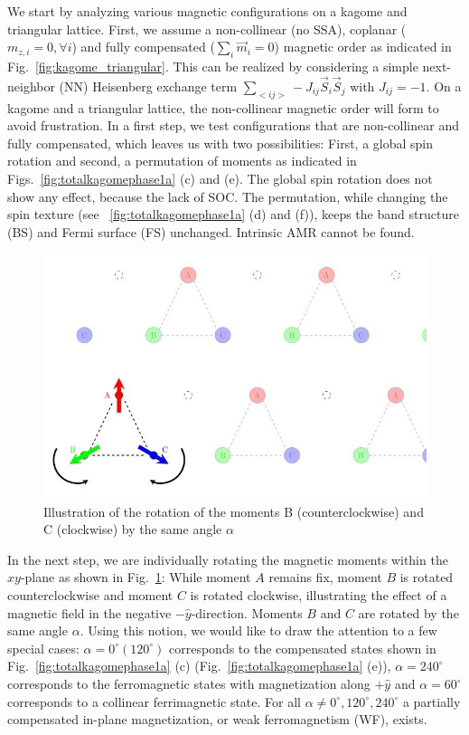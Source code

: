 \documentclass[prb,showpacs,amsmath,amssymb,superscriptaddress,twocolumn,floatfix]{revtex4-1}
\begin{document}
We start by analyzing various magnetic configurations on a kagome and triangular lattice. First, we assume a non-collinear (no SSA), coplanar ($m_{z,i} = 0, \forall i$) and fully compensated ($\sum_i \vec{m}_i = 0$) magnetic order as indicated in Fig.~\ref{fig:kagome_triangular}. This can be realized by considering a simple next-neighbor (NN) Heisenberg exchange term $\sum_{<ij>} -J_{ij} \vec{S}_i \vec{S}_j$ with $J_{ij} = -1$. On a kagome and a triangular lattice, the non-collinear magnetic order will form to avoid frustration. In a first step, we test configurations that are non-collinear and fully compensated, which leaves us with two possibilities: First, a global spin rotation and second, a permutation of moments as indicated in Figs.~\ref{fig:totalkagomephase1a} (c) and (e). The global spin rotation does not show any effect, because the lack of SOC. The permutation, while changing the spin texture (see ~\ref{fig:totalkagomephase1a} (d) and (f)), keeps the band structure (BS) and Fermi surface (FS) unchanged. Intrinsic AMR cannot be found. 

\begin{figure}
	\centering
	\includegraphics[width=0.9\linewidth]{img/kagome_rotation}
	\caption{Illustration of the rotation of the moments B (counterclockwise) and C (clockwise) by the same angle $\alpha$}
	\label{fig:kagomerotation}
\end{figure}


In the next step, we are individually rotating the magnetic moments
within the $xy$-plane as shown in Fig.~\ref{fig:kagomerotation}: While moment $A$ remains fix, moment $B$ is rotated counterclockwise and moment $C$ is rotated clockwise, illustrating the effect of a magnetic field in the negative $-\hat{y}$-direction. Moments $B$ and $C$ are rotated by the same angle $\alpha$. Using this notion, we would like to draw the attention to a few special cases: $\alpha = 0^\circ (120^\circ)$ corresponds to the compensated states shown in Fig.~\ref{fig:totalkagomephase1a} (c) (Fig.~\ref{fig:totalkagomephase1a} (e)), $\alpha = 240^\circ$ corresponds to the ferromagnetic states with magnetization along $+\hat{y}$ and $\alpha = 60^\circ$ corresponds to a collinear ferrimagnetic state. For all $\alpha \neq 0^\circ, 120^\circ, 240^\circ$ a partially compensated in-plane magnetization, or weak ferromagnetism (WF), exists. 
\end{document}
